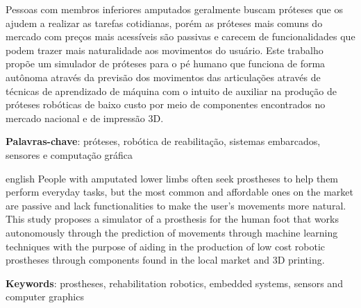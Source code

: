 \documentclass[
    12pt,       %
    oneside,    %
    a4paper,    %
%
    chapter=TITLE,	  	  %
%
    english,			  %
    brazil				  %
%
]{abntex2}
\begin{document}
\setlength{\absparsep}{18pt} %

\begin{resumo}[Resumo]
  Pessoas com membros inferiores amputados geralmente buscam próteses que os ajudem a realizar as tarefas cotidianas, porém as próteses mais comuns do mercado com preços mais acessíveis são passivas e carecem de funcionalidades que podem trazer mais naturalidade aos movimentos do usuário. Este trabalho propõe um simulador de próteses para o pé humano que funciona de forma autônoma através da previsão dos movimentos das articulações através de técnicas de aprendizado de máquina com o intuito de auxiliar na produção de próteses robóticas de baixo custo por meio de componentes encontrados no mercado nacional e de impressão 3D.

 \vspace{\onelineskip}

 \noindent
 \textbf{Palavras-chave}: próteses, robótica de reabilitação, sistemas embarcados, sensores e computação gráfica
\end{resumo}


\begin{resumo}[Abstract]
 \begin{otherlanguage*}{english}
People with amputated lower limbs often seek prostheses to help them perform everyday tasks, but the most common and affordable ones on the market are passive and lack functionalities to make the user's movements more natural. This study proposes a simulator of a prosthesis for the human foot that works autonomously through the prediction of movements through machine learning techniques with the purpose of aiding in the production of low cost robotic prostheses through components found in the local market and 3D printing.
  
  \vspace{\onelineskip}

    \noindent
    \textbf{Keywords}: prostheses, rehabilitation robotics, embedded systems, sensors and computer graphics
 \end{otherlanguage*}
\end{resumo}
\end{document}
